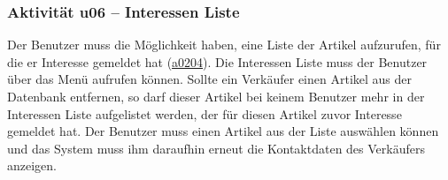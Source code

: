 \documentclass[a4paper,12pt,oneside]{scrartcl}
\begin{document}
%



\subsubsection{Aktivität u06 – Interessen Liste}
Der Benutzer muss die Möglichkeit haben, eine Liste der Artikel aufzurufen, für die er Interesse gemeldet hat (\hyperlink{u02}{a0204}). Die Interessen Liste muss der Benutzer über das Menü aufrufen können. 
Sollte ein Verkäufer einen Artikel aus der Datenbank entfernen, so darf dieser Artikel bei keinem Benutzer mehr in der Interessen Liste aufgelistet werden, der für diesen Artikel zuvor Interesse gemeldet hat. Der Benutzer muss einen Artikel aus der Liste auswählen können und das System muss ihm daraufhin erneut die Kontaktdaten des Verkäufers anzeigen.
\end{document}
